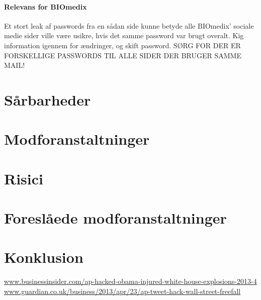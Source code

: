 \documentclass{article}
\begin{document}
\paragraph{Relevans for BIOmedix}

Et stort leak af passwords fra en sådan side kunne betyde alle BIOmedix' sociale medie sider ville være usikre, hvis det samme password var brugt overalt. Kig information igennem for ændringer, og skift password. SØRG FOR DER ER FORSKELLIGE PASSWORDS TIL ALLE SIDER DER BRUGER SAMME MAIL! 

\section{Sårbarheder}

\section{Modforanstaltninger}

\section{Risici}

\section{Foreslåede modforanstaltninger}

\section{Konklusion}
\newpage
\begin{thebibliography}{100}


\url{www.businessinsider.com/ap-hacked-obama-injured-white-house-explosions-2013-4}
\url{www.guardian.co.uk/business/2013/apr/23/ap-tweet-hack-wall-street-freefall}
\end{thebibliography}
\end{document}
